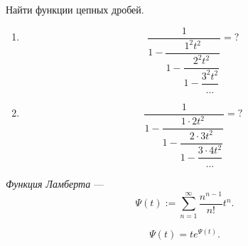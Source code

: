 \documentclass[12pt,a4paper]{article}
\begin{document}
    \begin{exercise}
        Найти функции цепных дробей.
        \begin{multicols}{2}
            \begin{enumerate}
                \item
                    \[
                        \dfrac{1}{
                            1 - \dfrac{1^2 t^2}{
                                1 - \dfrac{2^2 t^2}{
                                    1 - \dfrac{3^2 t^2}{
                                        \dots
                                    }
                                }
                            }
                        }
                        = {?}
                    \]
                \item
                    \[
                        \dfrac{1}{
                            1 - \dfrac{1 \cdot 2 t^2}{
                                1 - \dfrac{2 \cdot 3 t^2}{
                                    1 - \dfrac{3 \cdot 4 t^2}{
                                        \dots
                                    }
                                }
                            }
                        }
                        = {?}
                    \]
            \end{enumerate}
        \end{multicols}
    \end{exercise}

    \begin{definition}
        \emph{Функция Ламберта} ---
        \[\Psi(t) := \sum_{n=1}^\infty \frac{n^{n-1}}{n!} t^n.\]
    \end{definition}

    \begin{lemma}
        \[\Psi(t) = t e^{\Psi(t)}.\]
    \end{lemma}
\end{document}
